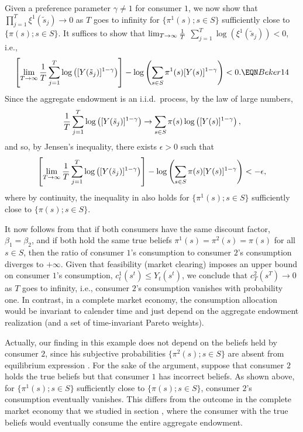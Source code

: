 Given a preference parameter $\gamma\neq 1$ for consumer $1$,
we now show that $\prod_{j=1}^{T} \xi^1(\tilde s_j) \rightarrow 0$ as $T$
goes to infinity for $\{\pi^1(s); s\in S\}$ sufficiently close
to $\{\pi(s); s\in S\}$. It suffices to show that
$\lim_{T\to\infty} {1 \over T}$
$ \sum_{j=1}^{T} \log( \xi^1(\tilde s_j)) <0$,
i.e.,
$$
\left[
\lim_{T\to\infty} {1 \over T} \sum_{j=1}^{T}
\log\left( [Y(\tilde s_j)]^{1-\gamma}  \right) \right]
- \log\left( \sum_{s\in S} \pi^1(s) [Y(s)]^{1-\gamma} \right) <0.  \EQN Beker14
$$
Since the aggregate endowment is an i.i.d.\ process, by the law of
large numbers,
$$
{1 \over T} \sum_{j=1}^{T} \log\left( [Y(\tilde s_j)]^{1-\gamma}  \right)
\rightarrow
\sum_{s\in S} \pi(s) \log \left( [Y(s)]^{1-\gamma} \right),     %
$$
and so, by Jensen's inequality, there exists $\epsilon >0$ such that
$$
\left[
\lim_{T\to\infty} {1 \over T} \sum_{j=1}^{T}
\log\left( [Y(\tilde s_j)]^{1-\gamma}  \right) \right]
- \log\left( \sum_{s\in S} \pi(s) [Y(s)]^{1-\gamma} \right) < -\epsilon,
$$
where by continuity, the inequality  in  also holds for
$\{\pi^1(s); s\in S\}$ sufficiently close to $\{\pi(s); s\in S\}$.

It now follows from  that if both consumers have the same
discount factor, $\beta_1=\beta_2$, and if both  hold the same true beliefs
$\pi^1(s)=\pi^2(s)=\pi(s)$ for all $s\in S$, then the ratio of consumer
$1$'s consumption to consumer $2$'s consumption diverges to $+ \infty$.
Given that feasibility (market clearing) imposes an upper bound on
consumer $1$'s consumption, $c^1_t(s^t) \leq Y_t(s^t)$, we conclude that
$c^2_T(s^T) \rightarrow 0$ as $T$ goes to infinity, i.e.,
consumer $2$'s consumption vanishes with probability one. In contrast, in a complete
market economy, the consumption allocation would be invariant to
calender time and just depend on the aggregate endowment
realization (and a set of time-invariant Pareto weights).

Actually, our finding in this example does not depend
on the beliefs held by consumer $2$, since his subjective
probabilities $\{\pi^2(s); s\in S\}$ are absent from equilibrium
expression . For the sake of the argument, suppose
that consumer $2$ holds the true beliefs but that consumer $1$ has incorrect
beliefs. As shown above, for
$\{\pi^1(s); s\in S\}$ sufficiently close to $\{\pi(s); s\in S\}$,
consumer $2$'s consumption  eventually vanishes.
This  differs from the outcome in the complete market
economy that we studied in section ,
where the consumer with the true beliefs would eventually consume the
entire aggregate endowment.

